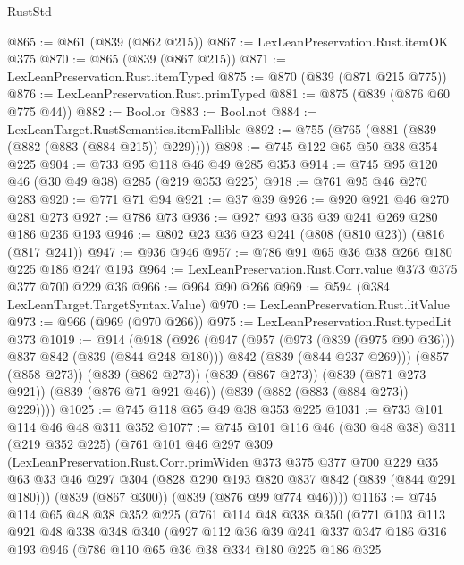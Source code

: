 \begin{lexlean}{RustStd}
\begin{coremodule}
@865 := @861 (@839 (@862 @215))
@867 := LexLeanPreservation.Rust.itemOK @375
@870 := @865 (@839 (@867 @215))
@871 := LexLeanPreservation.Rust.itemTyped
@875 := @870 (@839 (@871 @215 @775))
@876 := LexLeanPreservation.Rust.primTyped
@881 := @875 (@839 (@876 @60 @775 @44))
@882 := Bool.or
@883 := Bool.not
@884 := LexLeanTarget.RustSemantics.itemFallible
@892 := @755 (@765 (@881 (@839 (@882 (@883 (@884 @215)) @229))))
@898 := @745 @122 @65 @50 @38 @354 @225
@904 := @733 @95 @118 @46 @49 @285 @353
@914 := @745 @95 @120 @46 (@30 @49 @38) @285 (@219 @353 @225)
@918 := @761 @95 @46 @270 @283
@920 := @771 @71 @94
@921 := @37 @39
@926 := @920 @921 @46 @270 @281 @273
@927 := @786 @73
@936 := @927 @93 @36 @39 @241 @269 @280 @186 @236 @193
@946 := @802 @23 @36 @23 @241 (@808 (@810 @23)) (@816 (@817 @241))
@947 := @936 @946
@957 := @786 @91 @65 @36 @38 @266 @180 @225 @186 @247 @193
@964 := LexLeanPreservation.Rust.Corr.value @373 @375 @377 @700 @229 @36
@966 := @964 @90 @266
@969 := @594 (@384 LexLeanTarget.TargetSyntax.Value)
@970 := LexLeanPreservation.Rust.litValue
@973 := @966 (@969 (@970 @266))
@975 := LexLeanPreservation.Rust.typedLit @373
@1019 := @914
    (@918
      (@926
        (@947
          (@957 (@973 (@839 (@975 @90 @36))) @837 @842 (@839 (@844 @248 @180)))
          @842
          (@839 (@844 @237 @269)))
        (@857 (@858 @273))
        (@839 (@862 @273))
        (@839 (@867 @273))
        (@839 (@871 @273 @921))
        (@839 (@876 @71 @921 @46))
        (@839 (@882 (@883 (@884 @273)) @229))))
@1025 := @745 @118 @65 @49 @38 @353 @225
@1031 := @733 @101 @114 @46 @48 @311 @352
@1077 := @745
    @101
    @116
    @46
    (@30 @48 @38)
    @311
    (@219 @352 @225)
    (@761
      @101
      @46
      @297
      @309
      (LexLeanPreservation.Rust.Corr.primWiden
        @373
        @375
        @377
        @700
        @229
        @35
        @63
        @33
        @46
        @297
        @304
        (@828 @290 @193 @820 @837 @842 (@839 (@844 @291 @180)))
        (@839 (@867 @300))
        (@839 (@876 @99 @774 @46))))
@1163 := @745
    @114
    @65
    @48
    @38
    @352
    @225
    (@761
      @114
      @48
      @338
      @350
      (@771
        @103
        @113
        @921
        @48
        @338
        @348
        @340
        (@927
          @112
          @36
          @39
          @241
          @337
          @347
          @186
          @316
          @193
          @946
          (@786
            @110
            @65
            @36
            @38
            @334
            @180
            @225
            @186
            @325

\end{coremodule}
\end{lexlean}
